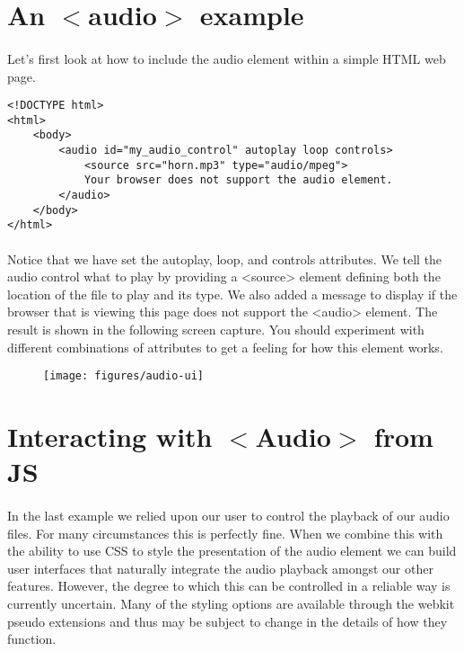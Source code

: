 \section{An $<$audio$>$ example}

\paragraph{} Let's first look at how to include the audio element within a simple HTML web page. 

\begin{lstlisting}
<!DOCTYPE html>
<html>
    <body>
        <audio id="my_audio_control" autoplay loop controls>
            <source src="horn.mp3" type="audio/mpeg">
            Your browser does not support the audio element.
        </audio>
    </body>
</html>
\end{lstlisting}

\paragraph{} Notice that we have set the autoplay, loop, and controls attributes. We tell the audio control what to play by providing a <source> element defining both the location of the file to play and its type. We also added a message to display if the browser that is viewing this page does not support the <audio> element. The result is shown in the following screen capture. You should experiment with different combinations of attributes to get a feeling for how this element works.

\begin{figure}[H]
\centering
\texttt{[image: figures/audio-ui]}
\label{fig:audio-ui}
\caption{}
\end{figure}

\section{Interacting with $<$Audio$>$ from JS}
\paragraph{} In the last example we relied upon our user to control the playback of our audio files. For many circumstances this is perfectly fine. When we combine this with the ability to use CSS to style the presentation of the audio element we can build user interfaces that naturally integrate the audio playback amongst our other features. However, the degree to which this can be controlled in a reliable way is currently uncertain. Many of the styling options are available through the webkit pseudo extensions and thus may be subject to change in the details of how they function.

